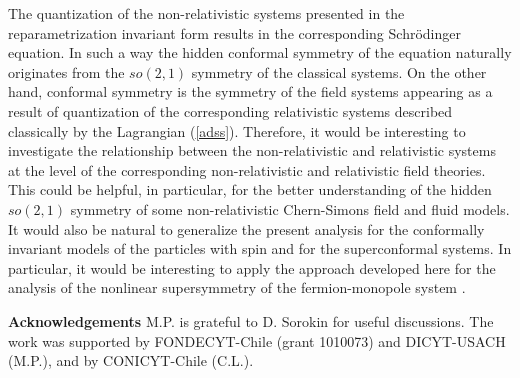 \documentclass[a4paper,12pt]{article}
\begin{document}
The quantization of the non-relativistic
systems presented in the reparametrization invariant
form results in the corresponding
Schr\"odinger equation.
In such a way the hidden conformal
symmetry of the equation
naturally originates
from the $so(2,1)$ symmetry
of the classical systems.
On the other hand,
conformal symmetry is
the symmetry of the
field systems appearing as a result
of quantization of the corresponding
relativistic systems described classically
by the Lagrangian (\ref{adss}).
Therefore, it would be interesting
to investigate the relationship
between the non-relativistic and relativistic
systems at the level of the corresponding
non-relativistic and relativistic field theories.
This could be helpful, in particular,
for the better understanding of the
hidden $so(2,1)$ symmetry of
some non-relativistic Chern-Simons field
\cite{conF1,conF2,dhp} and fluid \cite{hh,OR} models.
It would also be natural
to generalize the present analysis
for the conformally invariant models
of the particles with spin and
for the superconformal systems.
In particular, it would be interesting
to apply the approach developed here for the
analysis of the nonlinear supersymmetry
of the fermion-monopole system \cite{fm}.

\vskip 0.5cm
{\bf Acknowledgements}
\vskip 5mm
M.P. is grateful to D. Sorokin for useful discussions.
The work was supported by
FONDECYT-Chile (grant 1010073) and DICYT-USACH (M.P.),
and by CONICYT-Chile (C.L.).
\end{document}

